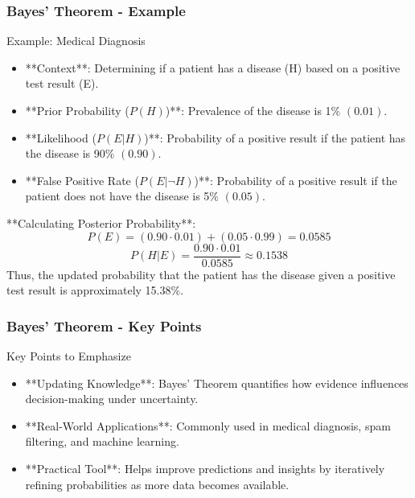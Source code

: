\documentclass[aspectratio=169]{beamer}
\begin{document}
\begin{frame}[fragile]
    \frametitle{Bayes' Theorem - Example}
    \begin{block}{Example: Medical Diagnosis}
        \begin{itemize}
            \item **Context**: Determining if a patient has a disease (H) based on a positive test result (E).
            \item **Prior Probability ($P(H)$)**: Prevalence of the disease is 1\% $(0.01)$.
            \item **Likelihood ($P(E|H)$)**: Probability of a positive result if the patient has the disease is 90\% $(0.90)$.
            \item **False Positive Rate ($P(E|\neg H)$)**: Probability of a positive result if the patient does not have the disease is 5\% $(0.05)$.
        \end{itemize}

        **Calculating Posterior Probability**: 
        \[
        P(E) = (0.90 \cdot 0.01) + (0.05 \cdot 0.99) = 0.0585
        \]
        \[
        P(H|E) = \frac{0.90 \cdot 0.01}{0.0585} \approx 0.1538 
        \]
        Thus, the updated probability that the patient has the disease given a positive test result is approximately 15.38\%.
    \end{block}
\end{frame}

\begin{frame}[fragile]
    \frametitle{Bayes' Theorem - Key Points}
    \begin{block}{Key Points to Emphasize}
        \begin{itemize}
            \item **Updating Knowledge**: Bayes' Theorem quantifies how evidence influences decision-making under uncertainty.
            \item **Real-World Applications**: Commonly used in medical diagnosis, spam filtering, and machine learning.
            \item **Practical Tool**: Helps improve predictions and insights by iteratively refining probabilities as more data becomes available.
        \end{itemize}
    \end{block}
\end{frame}
\end{document}
